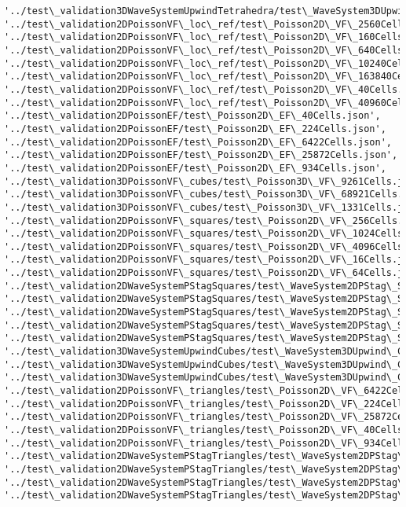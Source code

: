 \documentclass[11pt]{article}
\begin{document}
\begin{Verbatim}[commandchars=\\\{\}]
'../test\_validation3DWaveSystemUpwindTetrahedra/test\_WaveSystem3DUpwind\_CubeWithTetrahedra105456Cells.json', '../test\_validation2DPoissonVF\_loc\_ref/test\_Poisson2D\_VF\_2560Cells.json', '../test\_validation2DPoissonVF\_loc\_ref/test\_Poisson2D\_VF\_160Cells.json', '../test\_validation2DPoissonVF\_loc\_ref/test\_Poisson2D\_VF\_640Cells.json', '../test\_validation2DPoissonVF\_loc\_ref/test\_Poisson2D\_VF\_10240Cells.json', '../test\_validation2DPoissonVF\_loc\_ref/test\_Poisson2D\_VF\_163840Cells.json', '../test\_validation2DPoissonVF\_loc\_ref/test\_Poisson2D\_VF\_40Cells.json', '../test\_validation2DPoissonVF\_loc\_ref/test\_Poisson2D\_VF\_40960Cells.json', '../test\_validation2DPoissonEF/test\_Poisson2D\_EF\_40Cells.json', '../test\_validation2DPoissonEF/test\_Poisson2D\_EF\_224Cells.json', '../test\_validation2DPoissonEF/test\_Poisson2D\_EF\_6422Cells.json', '../test\_validation2DPoissonEF/test\_Poisson2D\_EF\_25872Cells.json', '../test\_validation2DPoissonEF/test\_Poisson2D\_EF\_934Cells.json', '../test\_validation3DPoissonVF\_cubes/test\_Poisson3D\_VF\_9261Cells.json', '../test\_validation3DPoissonVF\_cubes/test\_Poisson3D\_VF\_68921Cells.json', '../test\_validation3DPoissonVF\_cubes/test\_Poisson3D\_VF\_1331Cells.json', '../test\_validation2DPoissonVF\_squares/test\_Poisson2D\_VF\_256Cells.json', '../test\_validation2DPoissonVF\_squares/test\_Poisson2D\_VF\_1024Cells.json', '../test\_validation2DPoissonVF\_squares/test\_Poisson2D\_VF\_4096Cells.json', '../test\_validation2DPoissonVF\_squares/test\_Poisson2D\_VF\_16Cells.json', '../test\_validation2DPoissonVF\_squares/test\_Poisson2D\_VF\_64Cells.json', '../test\_validation2DWaveSystemPStagSquares/test\_WaveSystem2DPStag\_SquareWithSquares64Cells.json', '../test\_validation2DWaveSystemPStagSquares/test\_WaveSystem2DPStag\_SquareWithSquares16Cells.json', '../test\_validation2DWaveSystemPStagSquares/test\_WaveSystem2DPStag\_SquareWithSquares256Cells.json', '../test\_validation2DWaveSystemPStagSquares/test\_WaveSystem2DPStag\_SquareWithSquares1024Cells.json', '../test\_validation2DWaveSystemPStagSquares/test\_WaveSystem2DPStag\_SquareWithSquares4096Cells.json', '../test\_validation3DWaveSystemUpwindCubes/test\_WaveSystem3DUpwind\_CubeWithCubes216Cells.json', '../test\_validation3DWaveSystemUpwindCubes/test\_WaveSystem3DUpwind\_CubeWithCubes9261Cells.json', '../test\_validation3DWaveSystemUpwindCubes/test\_WaveSystem3DUpwind\_CubeWithCubes1331Cells.json', '../test\_validation2DPoissonVF\_triangles/test\_Poisson2D\_VF\_6422Cells.json', '../test\_validation2DPoissonVF\_triangles/test\_Poisson2D\_VF\_224Cells.json', '../test\_validation2DPoissonVF\_triangles/test\_Poisson2D\_VF\_25872Cells.json', '../test\_validation2DPoissonVF\_triangles/test\_Poisson2D\_VF\_40Cells.json', '../test\_validation2DPoissonVF\_triangles/test\_Poisson2D\_VF\_934Cells.json', '../test\_validation2DWaveSystemPStagTriangles/test\_WaveSystem2DPStag\_SquareWithTriangles6422Cells.json', '../test\_validation2DWaveSystemPStagTriangles/test\_WaveSystem2DPStag\_SquareWithTriangles224Cells.json', '../test\_validation2DWaveSystemPStagTriangles/test\_WaveSystem2DPStag\_SquareWithTriangles40Cells.json', '../test\_validation2DWaveSystemPStagTriangles/test\_WaveSystem2DPStag\_SquareWithTriangles934Cells.json', 
\end{Verbatim}
\end{document}
